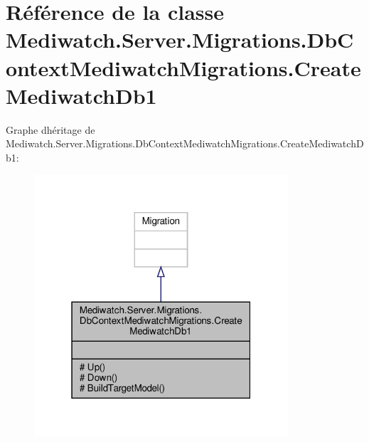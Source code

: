 \hypertarget{class_mediwatch_1_1_server_1_1_migrations_1_1_db_context_mediwatch_migrations_1_1_create_mediwatch_db1}{}\section{Référence de la classe Mediwatch.\+Server.\+Migrations.\+Db\+Context\+Mediwatch\+Migrations.\+Create\+Mediwatch\+Db1}
\label{class_mediwatch_1_1_server_1_1_migrations_1_1_db_context_mediwatch_migrations_1_1_create_mediwatch_db1}


Graphe d\textquotesingle{}héritage de Mediwatch.\+Server.\+Migrations.\+Db\+Context\+Mediwatch\+Migrations.\+Create\+Mediwatch\+Db1\+:
\nopagebreak
\begin{figure}[H]
\begin{center}
\leavevmode
\includegraphics[width=268pt]{class_mediwatch_1_1_server_1_1_migrations_1_1_db_context_mediwatch_migrations_1_1_create_mediwatch_db1__inherit__graph}
\end{center}
\end{figure}


